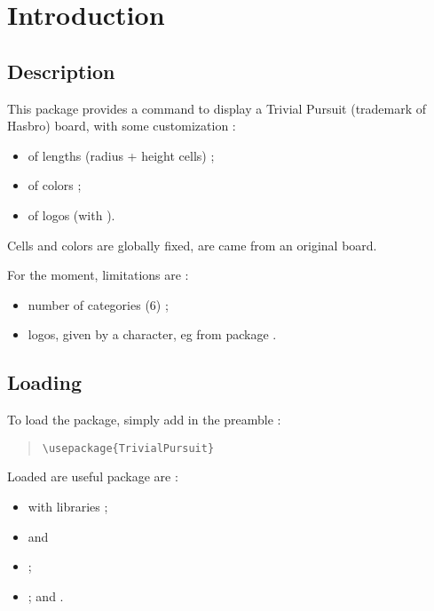 \documentclass[11pt,a4paper]{ltxdoc}
\begin{document}
\section{Introduction}

\subsection{Description}

This package provides a command to display a \textsf{Trivial Pursuit} (trademark of Hasbro) board, with some customization :

\begin{itemize}
	\item of lengths (radius + height cells) ;
	\item of colors ;
	\item of logos (with ).
\end{itemize}

Cells and colors are globally fixed, are came from an original board.

\medskip

For the moment, limitations are :

\begin{itemize}
	\item number of categories (6) ;
	\item logos, given by a character, eg from package .
\end{itemize}

\subsection{Loading}

To load the package, simply add in the preamble :

\begin{quote}
\begin{verbatim}
\usepackage{TrivialPursuit}
\end{verbatim}
\end{quote}

Loaded are useful package are :

\begin{itemize}
	\item {} with libraries  ;
	\item {} and \item {} ;
	\item {} ;  and .
\end{itemize}
\end{document}
